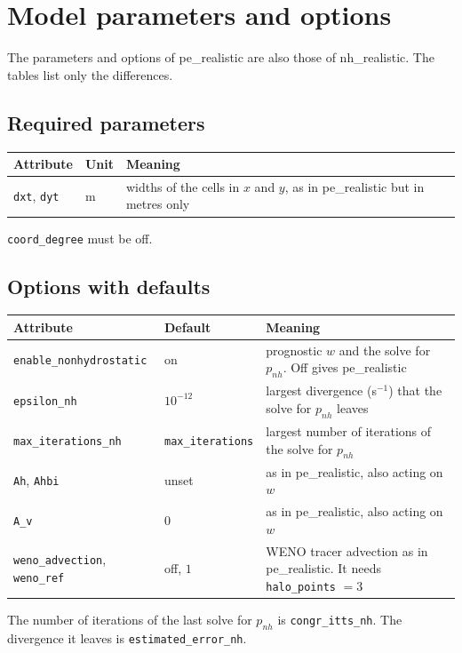 \documentclass[12pt]{article}
\begin{document}
\section*{Model parameters and options}

The parameters and options of pe\_realistic are also those of nh\_realistic.
The tables list only the differences.

\subsection*{Required parameters}

\begin{longtable}{@{}llp{8.4cm}@{}}
\hline
Attribute & Unit & Meaning \\
\hline
\endhead
\verb|dxt|, \verb|dyt| & m & widths of the cells in $x$ and $y$, as in pe\_realistic but in metres only \\
\hline
\end{longtable}

\noindent
\verb|coord_degree| must be off.

\subsection*{Options with defaults}

\begin{longtable}{@{}llp{7.6cm}@{}}
\hline
Attribute & Default & Meaning \\
\hline
\endhead
\verb|enable_nonhydrostatic| & on & prognostic $w$ and the solve for $p_{nh}$. Off gives pe\_realistic \\
\verb|epsilon_nh| & $10^{-12}$ & largest divergence (s$^{-1}$) that the solve for $p_{nh}$ leaves \\
\verb|max_iterations_nh| & \verb|max_iterations| & largest number of iterations of the solve for $p_{nh}$ \\
\verb|Ah|, \verb|Ahbi| & unset & as in pe\_realistic, also acting on $w$ \\
\verb|A_v| & $0$ & as in pe\_realistic, also acting on $w$ \\
\verb|weno_advection|, \verb|weno_ref| & off, $1$ & WENO tracer advection as in pe\_realistic.
  It needs \verb|halo_points| $=3$ \\
\hline
\end{longtable}

\noindent
The number of iterations of the last solve for $p_{nh}$ is \verb|congr_itts_nh|.
The divergence it leaves is \verb|estimated_error_nh|.
\end{document}
